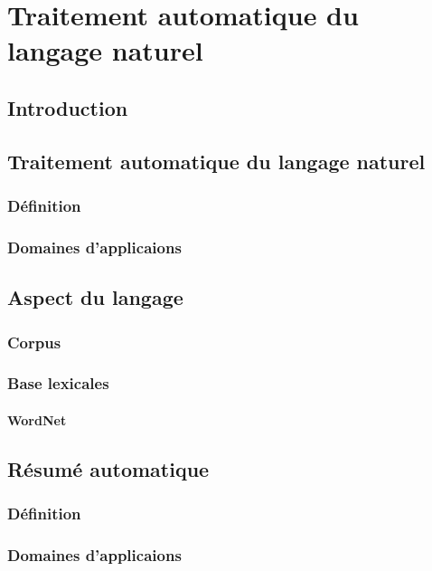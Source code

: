 \documentclass{report}
\begin{document}
% 
\tableofcontents
{}

\chapter{Traitement automatique du langage naturel}
\newpage
\section{Introduction}


\section{Traitement automatique du langage naturel}
    \subsection{Définition}

    \subsection{Domaines d'applicaions}


\section{Aspect du langage}
    \subsection{Corpus}

    \subsection{Base lexicales}
        \subsubsection{WordNet}


\section{Résumé automatique}
    \subsection{Définition}
    \subsection{Domaines d'applicaions}
\end{document}
